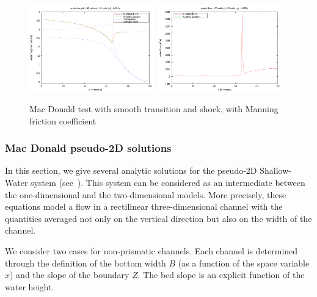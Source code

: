 \documentclass[a4paper, 11pt]{article}
\begin{document}
\begin{figure}[htbp]
	\includegraphics[width=0.48\textwidth]{Figures_FullSWOF_2D/MacDo_tor_flu_tor_Man_h}\ \includegraphics[width=0.48\textwidth]{Figures_FullSWOF_2D/MacDo_tor_flu_tor_Man_q}
	\caption{Mac Donald test with smooth transition and shock, with Manning friction coefficient}
	\label{FigMacDosmoothtrans}
\end{figure}

\subsubsection{Mac Donald pseudo-2D solutions}
In this section, we give several analytic solutions for the pseudo-2D Shallow-Water system (see~\citep[§~3.5]{Delestre13}). 
This system can be considered as an intermediate between the one-dimensional and the two-dimensional models. 
More precisely, these equations model a flow in a rectilinear three-di\-men\-sional channel
with the quantities averaged not only on the vertical direction but also on the width of the channel.

We consider two cases for non-prismatic channels. Each channel is determined through the definition of the bottom width $B$ (as a function of the space variable $x$) and the slope of the boundary $Z$.
The bed slope is an explicit function of the water height.
\end{document}
